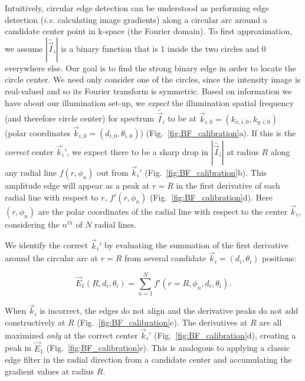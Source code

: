 Intuitively, circular edge detection can be understood as performing edge detection (\textit{i.e.} calculating image gradients) along a circular arc around a candidate center point in k-space (the Fourier domain). To first approximation, we assume $|\tilde{\vec{I}_i}|$ is a binary function that is 1 inside the two circles and 0 everywhere else. Our goal is to find the strong binary edge in order to locate the circle center.  We need only consider one of the circles, since the intensity image is real-valued and so its Fourier transform is symmetric. Based on information we have about our illumination set-up, we \textit{expect} the illumination spatial frequency (and therefore circle center) for spectrum $\tilde{\vec{I}_i}$ to be at $\vec{k}_{i,0} = (k_{x,i,0},k_{y,i,0})$ (polar coordinates $\vec{k}_{i,0} = (d_{i,0}, \theta_{i,0})$) (Fig.~\ref{fig:BF_calibration}a). If this is the \textit{correct} center  $\vec{k}_i'$, we expect there to be a sharp drop in $|\tilde{\vec{I}_i}|$ at radius $R$ along any radial line $f(r,\phi_n)$ out from $\vec{k}_i'$ (Fig.~\ref{fig:BF_calibration}b). This amplitude edge will appear as a peak at $r=R$ in the first derivative of each radial line with respect to $r$, $f'(r,\phi_n)$ (Fig.~\ref{fig:BF_calibration}d). Here $(r,\phi_n)$ are the polar coordinates of the radial line with respect to the center $\vec{k}_i$, considering the $n^{th}$ of $N$ radial lines.

We identify the correct $\vec{k}_i'$ by evaluating the summation of the first derivative around the circular arc at $r=R$ from several candidate $\vec{k}_i = (d_i,\theta_i)$ positions:

\begin{equation}
\vec{E}_1(R, d_i,\theta_i)=\sum_{n=1}^{N} f'(r = R,\phi_n,d_i,\theta_i).
\label{eq:eprime}
\end{equation}

\noindent When $\vec{k}_i$ is incorrect, the edges do not align and the derivative peaks do not add constructively at $R$ (Fig.~\ref{fig:BF_calibration}c). The derivatives at $R$ are all maximized \textit{only} at the correct center $\vec{k}_i'$ (Fig.~\ref{fig:BF_calibration}d), creating a peak in $\vec{E}_1$ (Fig.~\ref{fig:BF_calibration}e). This is analogous to applying a classic edge filter in the radial direction from a candidate center and accumulating the gradient values at radius $R$.

